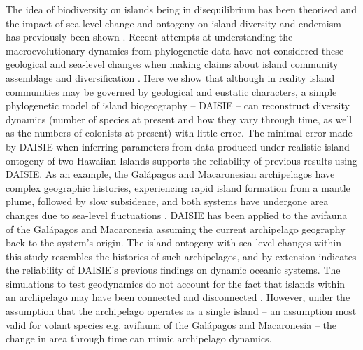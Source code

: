 \documentclass{article}
\begin{document}
The idea of biodiversity on islands being in disequilibrium has been theorised \citep{whittaker_general_2008, fernandezpalacios_towards_2016} and the impact of sea-level change and ontogeny on island diversity and endemism has previously been shown \citep{lim_true_2017, norder_beyond_2019}. Recent attempts at understanding the macroevolutionary dynamics from phylogenetic data have not considered these geological and sea-level changes when making claims about island community assemblage and diversification \citep{valente_equilibrium_2015, valente_simple_2020}. Here we show that although in reality island communities may be governed by geological and eustatic characters, a simple phylogenetic model of island biogeography – DAISIE – can reconstruct diversity dynamics (number of species at present and how they vary through time, as well as the numbers of colonists at present) with little error. The minimal error made by DAISIE when inferring parameters from data produced under realistic island ontogeny of two Hawaiian Islands supports the reliability of previous results using DAISIE. As an example, the Gal\'{a}pagos and Macaronesian archipelagos have complex geographic histories, experiencing rapid island formation from a mantle plume, followed by slow subsidence, and both systems have undergone area changes due to sea-level fluctuations \citep{fernandez-palacios_reconstruction_2011, ali_exploring_2014, geist_2014_paleogeographic, rijsdijk_quantifying_2014}. DAISIE has been applied to the avifauna of the Gal\'{a}pagos and Macaronesia assuming the current archipelago geography back to the system’s origin. The island ontogeny with sea-level changes within this study resembles the histories of such archipelagos, and by extension indicates the reliability of DAISIE’s previous findings on dynamic oceanic systems. The simulations to test geodynamics do not account for the fact that islands within an archipelago may have been connected and disconnected \citep{aguilee_biogeographic_2021}. However, under the assumption that the archipelago operates as a single island – an assumption most valid for volant species e.g. avifauna of the Gal\'{a}pagos \citep{valente_equilibrium_2015} and Macaronesia \citep{valente_equilibrium_2017} – the change in area through time can mimic archipelago dynamics. \\
\end{document}
